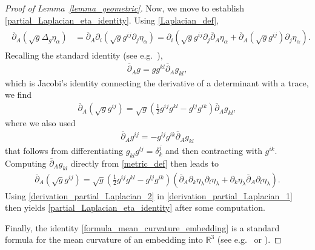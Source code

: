 \documentclass[10pt,reqno]{amsart}
\theoremstyle{plain}
\theoremstyle{definition}
\numberwithin{equation}{section}
\newcommand{\al}{\alpha}
\newcommand{\de}{\delta}
\newcommand{\la}{\lambda}
\newcommand{\RR}{\mathbb R}
\begin{document}
\begin{proof}[Proof of Lemma~\ref{lemma_geometric}]
Now, we  move to establish \eqref{partial_Laplacian_eta_identity}.
Using \eqref{Laplacian_def},
\begin{align}
\begin{split}
\overline{\partial}_A (\sqrt{g} \Delta_g \eta_\al )
&= 
\overline{\partial}_A \partial_i (\sqrt{g} g^{ij} \partial_j \eta_\al ) 
 = \partial_i( \sqrt{g} g^{ij} \partial_j \overline{\partial}_A \eta_\al 
+ \overline{\partial}_A(\sqrt{g} g^{ij} ) \partial_j \eta_\al ).
\end{split}
\label{derivation_partial_Laplacian_1}
\end{align}
Recalling the 
standard identity (see e.g.~\cite[p.~51]{GieriBook}),
\begin{gather}
\overline{\partial}_A g = g g^{kl} \overline{\partial}_A g_{kl},
\label{identity_det_g}
\end{gather}
which is Jacobi's identity connecting the 
derivative of a determinant with a trace,
we find
\begin{gather}
 \overline{\partial}_A(\sqrt{g} g^{ij} )  = \sqrt{g}
  \left(\frac{1}{2} g^{ij}   g^{kl} - g^{lj} g^{ik} \right)  \overline{\partial}_A g_{kl} , 
    \nonumber
  \end{gather}
where we also used 
\begin{gather}
 \overline{\partial}_A g^{ij} = - g^{lj} g^{ik}  \overline{\partial}_A g_{kl}
 \label{identity_g_inverse}
 \end{gather}
that follows from differentiating $g_{kl}g^{lj} = \de_k^j$ and then contracting with
$g^{ik}$. Computing $\overline{\partial}_A g_{kl}$ directly from \eqref{metric_def}
then leads to
\begin{gather}
 \overline{\partial}_A(\sqrt{g} g^{ij} )  = \sqrt{g}
  \left(\frac{1}{2} g^{ij}   g^{kl} - g^{lj} g^{ik} \right)  ( \overline{\partial}_A \partial_k \eta_\la 
  \partial_l \eta_\la + \partial_k \eta_\la \overline{\partial}_A \partial_l \eta_\la  )
   .
\label{derivation_partial_Laplacian_2}
  \end{gather}
Using \eqref{derivation_partial_Laplacian_2} in  \eqref{derivation_partial_Laplacian_1}
then yields \eqref{partial_Laplacian_eta_identity} after some %
computation.

Finally, the identity \eqref{formula_mean_curvature_embedding} is a standard formula
for the mean curvature of an embedding into $\RR^3$ 
(see e.g.~\cite[Section~2.1]{HanIsometricEmbedding} or \cite[Section~I.2]{GieriBook}).
\end{proof}
\end{document}
